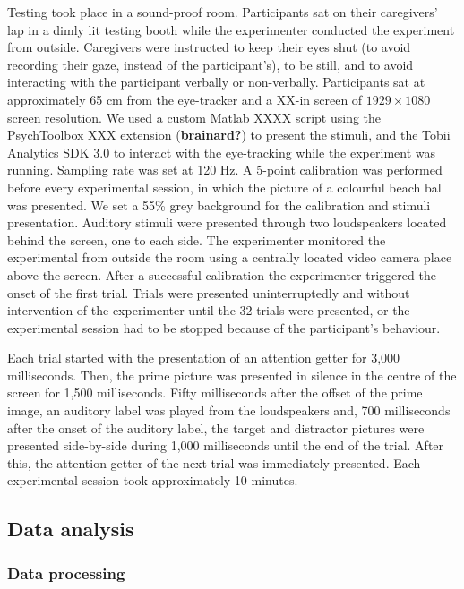 \documentclass[
  letterpaper,
  DIV=11,
  numbers=noendperiod]{scrartcl}
\begin{document}
Testing took place in a sound-proof room. Participants sat on their
caregivers' lap in a dimly lit testing booth while the experimenter
conducted the experiment from outside. Caregivers were instructed to
keep their eyes shut (to avoid recording their gaze, instead of the
participant's), to be still, and to avoid interacting with the
participant verbally or non-verbally. Participants sat at approximately
65 cm from the eye-tracker and a XX-in screen of \(1929\times1080\)
screen resolution. We used a custom Matlab XXXX script using the
PsychToolbox XXX extension
(\protect\hyperlink{ref-brainard}{\textbf{brainard?}}) to present the
stimuli, and the Tobii Analytics SDK 3.0 to interact with the
eye-tracking while the experiment was running. Sampling rate was set at
120 Hz. A 5-point calibration was performed before every experimental
session, in which the picture of a colourful beach ball was presented.
We set a 55\% grey background for the calibration and stimuli
presentation. Auditory stimuli were presented through two loudspeakers
located behind the screen, one to each side. The experimenter monitored
the experimental from outside the room using a centrally located video
camera place above the screen. After a successful calibration the
experimenter triggered the onset of the first trial. Trials were
presented uninterruptedly and without intervention of the experimenter
until the 32 trials were presented, or the experimental session had to
be stopped because of the participant's behaviour.

Each trial started with the presentation of an attention getter for
3,000 milliseconds. Then, the prime picture was presented in silence in
the centre of the screen for 1,500 milliseconds. Fifty milliseconds
after the offset of the prime image, an auditory label was played from
the loudspeakers and, 700 milliseconds after the onset of the auditory
label, the target and distractor pictures were presented side-by-side
during 1,000 milliseconds until the end of the trial. After this, the
attention getter of the next trial was immediately presented. Each
experimental session took approximately 10 minutes.

\hypertarget{data-analysis}{%
\subsection{Data analysis}\label{data-analysis}}

\hypertarget{data-processing}{%
\subsubsection{Data processing}\label{data-processing}}
\end{document}
